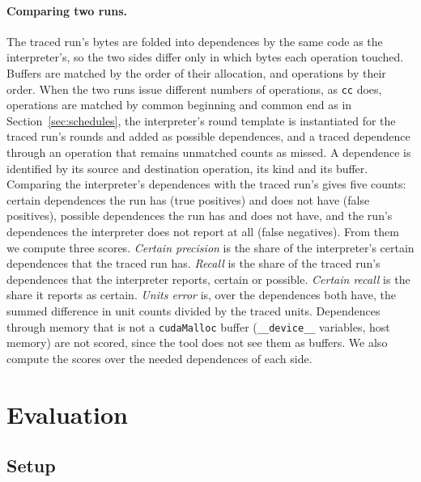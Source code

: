 \documentclass[11pt]{article}
\newcommand{\secref}[1]{Section~\ref{#1}}
\newcommand{\term}[1]{\emph{#1}}
\newcommand{\code}[1]{\texttt{#1}}
\begin{document}
\paragraph{Comparing two runs.} The traced run's bytes are folded into dependences by the same code as the
interpreter's, so the two sides differ only in which bytes each operation touched. Buffers are matched by the
order of their allocation, and operations by their order. When the two runs issue different numbers of operations,
as \code{cc} does, operations are matched by common beginning and common end as in \secref{sec:schedules}, the
interpreter's round template is instantiated for the traced run's rounds and added as possible dependences, and a
traced dependence through an operation that remains unmatched counts as missed. A dependence is identified by its
source and destination operation, its kind and its buffer. Comparing the interpreter's dependences with the traced
run's gives five counts: certain dependences the run has (true positives) and does not have (false positives),
possible dependences the run has and does not have, and the run's dependences the interpreter does not report at
all (false negatives). From them we compute three scores. \term{Certain precision} is the share of the
interpreter's certain dependences that the traced run has. \term{Recall} is the share of the traced run's
dependences that the interpreter reports, certain or possible. \term{Certain recall} is the share it reports as
certain. \term{Units error} is, over the dependences both have, the summed difference in unit counts divided by
the traced units. Dependences through memory that is not a \code{cudaMalloc} buffer (\code{\_\_device\_\_} variables, host
memory) are not scored, since the tool does not see them as buffers. We also compute the scores over the needed
dependences of each side.

\section{Evaluation}
\label{sec:eval}

\subsection{Setup}
\label{sec:setup}
\end{document}
